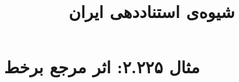 \documentclass[a4paper,10pt]{article}
\begin{document}
\title{شیوه‌ی استناددهی ایران
 }
\author{}
\date{}
\maketitle



\section*{مثال ۲.۲۲۵: اثر مرجع برخط}

\cite{پارس1385}\\
\cite{ایران1385}\\
\cite{britanica2002}\\
\cite{music2002}\\






\end{document}
